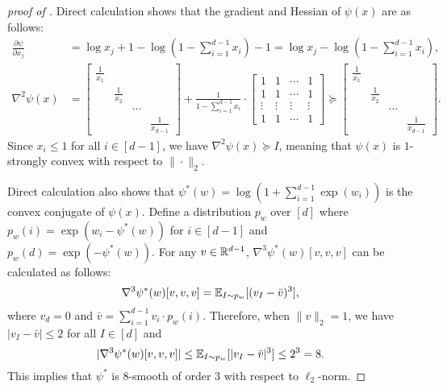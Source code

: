\begin{proof}[proof of ]
    Direct calculation shows that the gradient and Hessian of $
        \psi(x)$ are as follows:
    \begin{align*}
    \frac{\partial \psi}{\partial x_j}&=\log x_j+1-\log(1-\sum_{i=1}^{d-1}x_i)-1=\log x_j-\log(1-\sum_{i=1}^{d-1}x_i),\\
    \nabla^2\psi(x)&=\begin{bmatrix}
    \frac{1}{x_1}&&&\\
    &\frac{1}{x_2}&&\\
    &&\cdots&\\
    &&&\frac{1}{x_{d-1}}
    \end{bmatrix}+\frac{1}{1-\sum_{i=1}^{d-1}x_i}\cdot 
    \begin{bmatrix}
    1&1&\cdots&1\\
    1&1&\cdots&1\\
    \vdots&\vdots&\vdots&\vdots\\
    1&1&\cdots&1
    \end{bmatrix}\succeq \begin{bmatrix}
    \frac{1}{x_1}&&&\\
    &\frac{1}{x_2}&&\\
    &&\cdots&\\
    &&&\frac{1}{x_{d-1}}
    \end{bmatrix}.
    \end{align*}
    Since $x_i\leq 1$ for all $i\in[d-1]$, we have $\nabla^2\psi(x)\succeq I$, meaning that $\psi(x)$ is $1$-strongly convex with respect to $\|\cdot\|_2$.    

    Direct calculation also shows that $\psi^*(w)=\log\left(1+\sum_{i=1}^{d-1}\exp(w_i)\right)$ is the convex conjugate of $\psi(x)$. Define a distribution $p_w$ over $[d]$ where $p_w(i)=\exp(w_i-\psi^*(w))$ for $i\in [d-1]$ and $p_w(d)=\exp(-\psi^*(w))$. For any $v\in\mathbb{R}^{d-1}$, $\nabla^3\psi^*(w)[v,v,v]$ can be calculated as follows:
    \begin{align*}
        \nabla^3\psi^*(w)[v,v,v] = \mathbb{E}_{I\sim p_w}[(v_I-\bar{v})^3],
    \end{align*}
    where $v_d=0$ and $\bar{v}=\sum_{i=1}^{d-1}v_i\cdot p_w(i)$. Therefore, when $\|v\|_2=1$, we have $|v_I-\bar{v}|\leq 2$ for all $I\in[d]$ and 
    \[
    |\nabla^3\psi^*(w)[v,v,v]|\le \mathbb{E}_{I\sim p_w}[|v_I-\Bar{v}|^3]\le  2^3=8.
    \]
    This implies that $\psi^*$ is $8$-smooth of order $3$ with respect to $\ell_2$-norm.
\end{proof}


